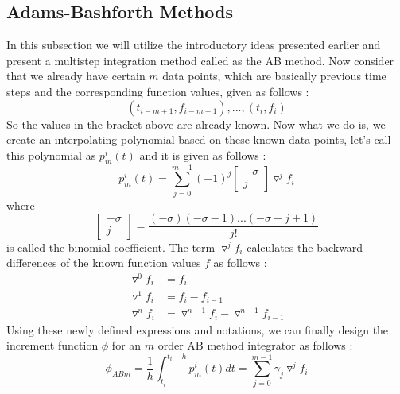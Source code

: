 \subsection{Adams-Bashforth Methods}
In this subsection we will utilize the introductory ideas presented earlier and present a multistep integration method called as the \gls{AB} method. Now consider that we already have certain $m$ data points, which are basically previous time steps and the corresponding function values, given as follows \cite{gillbook}:
\begin{equation}
(t_{i-m+1}, f_{i-m+1}),...,(t_i, f_i)
\end{equation}
%
So the values in the bracket above are already known. Now what we do is, we create an interpolating polynomial based on these known data points, let's call this polynomial as $p_m^i(t)$ and it is given as follows \cite{gillbook}:
\begin{equation}
\label{inter_poly}
p_m^i(t) = \sum_{j=0}^{m-1} (-1)^j
\begin{bmatrix}
-\sigma \\
j
\end{bmatrix}
\triangledown^j f_i
\end{equation}
%
where
\begin{equation}
\label{bin_coef}
\begin{bmatrix}
-\sigma\\
j
\end{bmatrix}
= \frac{(-\sigma)(-\sigma-1)...(-\sigma-j+1)}{j!}
\end{equation}
%
is called the binomial coefficient. The term $\triangledown^j f_i$ calculates the backward-differences of the known function values $f$ as follows \cite{gillbook}:
\begin{equation}
\label{f_ab}
\begin{aligned}
\triangledown^0 f_i &= f_i \\
\triangledown^1 f_i &= f_i - f_{i-1} \\
\triangledown^n f_i &= \triangledown^{n-1} f_i - \triangledown^{n-1} f_{i-1}
\end{aligned}
\end{equation}
%
Using these newly defined expressions and notations, we can finally design the increment function $\phi$ for an $m$ order \gls{AB} method integrator as follows \cite{gillbook}:
\begin{equation}
\label{phi_ab}
\phi_{ABm} = \frac{1}{h} \int_{t_i}^{t_i + h} p_m^i(t)dt = \sum_{j=0}^{m-1} \gamma_j \triangledown^j f_i
\end{equation}

